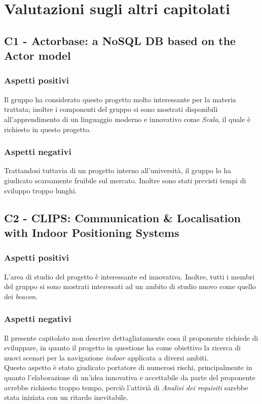 \section{Valutazioni sugli altri capitolati}

\subsection{C1 - Actorbase: a NoSQL DB based on the Actor model}
\subsubsection{Aspetti positivi}
Il gruppo ha considerato questo progetto molto interessante per la materia trattata; inoltre
i componenti del gruppo si sono mostrati disponibili all'apprendimento di un linguaggio 
moderno e innovativo come \textit{Scala}, il quale \`e richiesto in questo progetto.
\subsubsection{Aspetti negativi}
Trattandosi tuttavia di un progetto interno all'universit\`a, il gruppo lo ha giudicato scarsamente
fruibile sul mercato. Inoltre sono stati previsti tempi di sviluppo troppo lunghi.


\subsection{C2 - CLIPS: Communication & Localisation with Indoor Positioning Systems}
\subsubsection{Aspetti positivi}
L'area di studio del progetto \`è interessante ed innovativa. Inoltre, tutti i membri
del gruppo si sono mostrati interessati ad un ambito di studio nuovo come quello dei \textit{beacon}.
\subsubsection{Aspetti negativi}
Il presente capitolato non descrive dettagliatamente cosa il proponente richiede di sviluppare,
in quanto il progetto in questione ha come obiettivo la ricerca di nuovi scenari per la navigazione \textit{indoor}
applicata a diversi ambiti.\\
Questo aspetto \`e stato giudicato portatore di numerosi rischi, principalmente
in quanto l'elaborazione di un'idea innovativa e accettabile da parte del proponente avrebbe richiesto troppo tempo,
perci\`o l'attivi\`a di \textit{Analisi dei requisiti} sarebbe stata iniziata con un ritardo inevitabile. 


